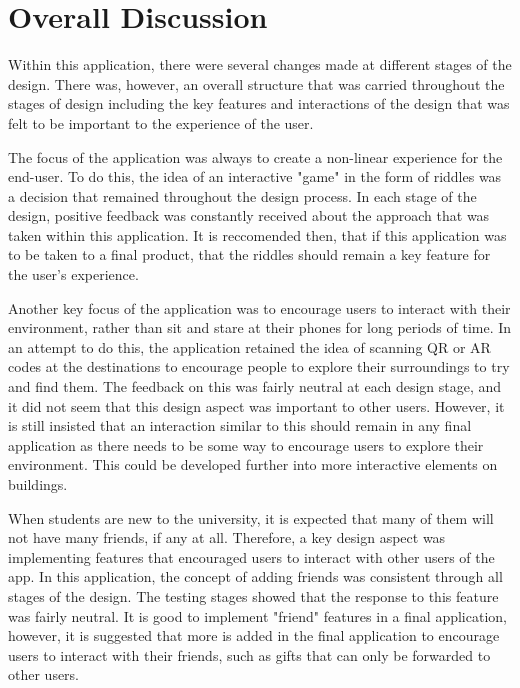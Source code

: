 \documentclass[10pt,twocolumn]{article} %
\begin{document}
\section*{Overall Discussion}
Within this application, there were several changes made at different stages of the design. There was, however, an overall structure that was carried throughout the stages of design including the key features and interactions of the design that was felt to be important to the experience of the user.

The focus of the application was always to create a non-linear experience for the end-user. To do this, the idea of an interactive "game" in the form of riddles was a decision that remained throughout the design process. In each stage of the design, positive feedback was constantly received about the approach that was taken within this application. It is reccomended then, that if this application was to be taken to a final product, that the riddles should remain a key feature for the user's experience.

Another key focus of the application was to encourage users to interact with their environment, rather than sit and stare at their phones for long periods of time. In an attempt to do this, the application retained the idea of scanning QR or AR codes at the destinations to encourage people to explore their surroundings to try and find them. The feedback on this was fairly neutral at each design stage, and it did not seem that this design aspect was important to other users. However, it is still insisted that an interaction similar to this should remain in any final application as there needs to be some way to encourage users to explore their environment. This could be developed further into more interactive elements on buildings.

When students are new to the university, it is expected that many of them will not have many friends, if any at all. Therefore, a key design aspect was implementing features that encouraged users to interact with other users of the app. In this application, the concept of adding friends was consistent through all stages of the design. The testing stages showed that the response to this feature was fairly neutral. It is good to implement "friend" features in a final application, however, it is suggested that more is added in the final application to encourage users to interact with their friends, such as gifts that can only be forwarded to other users.
\end{document}
